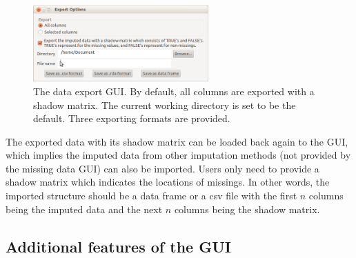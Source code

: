 \documentclass[article]{jss}
\begin{document}
\begin{center}
\begin{figure}[h]
\begin{centering}
\includegraphics[width=0.6\textwidth]{graph/fig7-export}
\par\end{centering}
\caption{The data export GUI. By default, all columns are exported with a shadow matrix. The current working directory is set to be the default. Three exporting formats are provided.}
\label{fig: export}
\end{figure}
\par\end{center}


The exported data with its shadow matrix can be loaded back again to the GUI, which implies the imputed data from other imputation methods (not provided by the missing data GUI) can also be imported. Users only need to provide a shadow matrix which indicates the locations of missings. In other words, the imported structure should be a data frame or a csv file with the first $n$ columns being the imputed data and the next $n$ columns being the shadow matrix.


\subsection{Additional features of the GUI}
\end{document}
